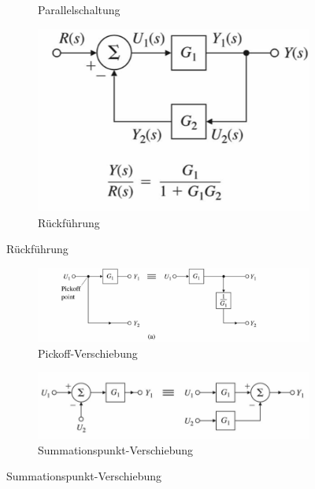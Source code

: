 \begin{tcolorbox}[colback=white!10!white,colframe=blue!50!black,title=Regeln]
\begin{figure}[H]
\begin{subfigure}{.3\textwidth}
    \caption{Parallelschaltung}
    \label{fig:parallel}
        \end{subfigure}%
            \begin{subfigure}{.3\textwidth}
                \centering
                \includegraphics[width=1\textwidth]{images/back}
                \caption{Rückführung}
                \label{fig:back}
            \end{subfigure}%
    \end{figure}
\begin{figure}[H]

            \begin{subfigure}{.5\textwidth}
            \centering
            \includegraphics[width=1\textwidth]{images/verschiebung_punkt}
            \caption{Pickoff-Verschiebung}
            \label{fig:pickoff}
            \end{subfigure}%
            \begin{subfigure}{.5\textwidth}
                \centering
                \includegraphics[width=1\textwidth]{images/sum_front}
                \caption{Summationspunkt-Verschiebung}
                \label{fig:sum}
            \end{subfigure}%
            


\end{figure}
\end{tcolorbox}
